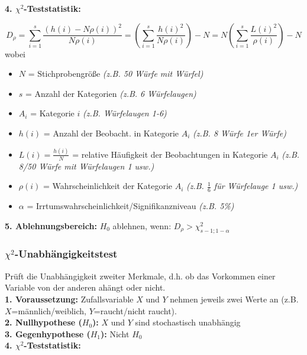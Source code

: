 \textbf{4. \(\chi^2\)-Teststatistik:}

\begin{equation*}
    D_{\rho} = \sum_{i=1}^{s}\frac{(h(i)-N\rho(i))^2}{N\rho(i)}=\left(\sum_{i=1}^{s}\frac{h(i)^2}{N\rho(i)}\right)-N=N\left(\sum_{i=1}^{s}\frac{L(i)^2}{\rho(i)}\right) - N
\end{equation*}
wobei
\begin{itemize}
    \item \(N\) = Stichprobengröße \emph{(z.B. 50 Würfe mit Würfel)}
    \item \(s\) = Anzahl der Kategorien \emph{(z.B. 6 Würfelaugen)}
    \item \(A_i\) = Kategorie \(i\) \emph{(z.B. Würfelaugen 1-6)}
    \item \(h(i)\) = Anzahl der Beobacht. in Kategorie \(A_i\) \emph{(z.B. 8 Würfe 1er Würfe)}
    \item \(L(i)=\frac{h(i)}{N}\) = relative Häufigkeit der Beobachtungen in Kategorie \(A_i\) \emph{(z.B. 8/50 Würfe mit Würfelaugen 1 usw.)}
    \item \(\rho(i)\) = Wahrscheinlichkeit der Kategorie \(A_i\) \emph{(z.B. \(\frac{1}{6}\) für Würfelauge 1 usw.)}
    \item \(\alpha\) = Irrtumswahrscheinlichkeit/Signifikanzniveau \emph{(z.B. 5\%)}
\end{itemize}

\textbf{5. Ablehnungsbereich:} \(H_0\) ablehnen, wenn:  \(D_{\rho} > \chi^2_{s-1;1-\alpha}\)\\


\subsubsection{\(\chi^2\)-Unabhängigkeitstest}

Prüft die Unabhängigkeit zweiter Merkmale, d.h. ob das Vorkommen einer Variable von der anderen ahängt oder nicht.\\


\textbf{1. Voraussetzung:} Zufallsvariable \(X\) und \(Y\) nehmen jeweils zwei Werte an (z.B. \(X\)=männlich/weiblich, \(Y\)=raucht/nicht raucht).\\

\textbf{2. Nullhypothese (\(H_0\)):} \(X\) und \(Y\) sind stochastisch unabhängig\\

\textbf{3. Gegenhypothese (\(H_1\)):} Nicht \(H_0\)\\

\textbf{4. \(\chi^2\)-Teststatistik:}\\

